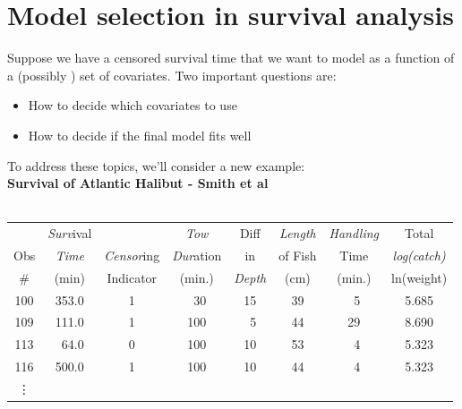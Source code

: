 \documentclass[11pt]{book}
\begin{document}
\setcounter{chapter}{6} \setcounter{page}{106}
\chapter{Model selection in survival analysis}
Suppose we have a censored survival time that we want to model
as a function of a (possibly ) set of covariates.  Two important
questions are:
\begin{itemize}
\item  How to decide which covariates to use
\item  How to decide if the final model fits well
\end{itemize}
To address these topics, we'll consider a new example:
\\[2ex]
{\bf Survival of Atlantic Halibut - Smith et al}\\
\\[2ex]
\begin{tabular}{cccccccc}
\hline
     & {\it Surv}ival &           & {\it Tow}      & Diff & {\it Length}
& {\it Handling } & Total \\
 Obs & {\it Time} & {\it Censor}ing & {\it Dur}ation & in   &  of Fish
&  Time    & {\it log(catch)} \\
 \# & (min)  & Indicator & (min.) & {\it Depth} & (cm) &
(min.) & ln(weight) \\ \hline
 100 &  353.0 &  1  & ~30 & 15 &  39  & ~5 &  5.685 \\
 109 &  111.0 &  1  & 100 & ~5 &  44  & 29 &  8.690 \\
 113 &  ~64.0 &  0  & 100 & 10 &  53  & ~4 &  5.323 \\
 116 &  500.0 &  1  & 100 & 10 &  44  & ~4 &  5.323 \\
\vdots \\
 \hline
\end{tabular}

\normalsize
\end{document}
